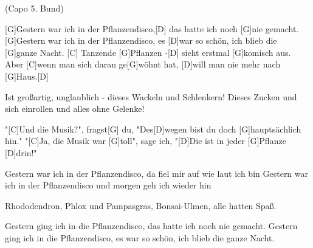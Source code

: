 
 {\footnotesize(Capo 5. Bund)}

\begin{guitar}
	[G]Gestern war ich in der Pflanzendisco,[D] das hatte ich noch [G]nie gemacht.
	[G]Gestern war ich in der Pflanzendisco, es [D]war so schön, ich blieb die [G]ganze Nacht.
	[C] Tanzende [G]Pflanzen -[D] sieht erstmal [G]komisch aus.
	Aber [C]wenn man sich daran ge[G]wöhnt hat, [D]will man nie mehr nach [G]Haus.[D]{}
	
	Ist großartig, unglaublich - dieses Wackeln und Schlenkern!
	Dieses Zucken und sich einrollen und alles ohne Gelenke!
	
	"[C]Und die Musik?", fragst[G] du, "Des[D]wegen bist du doch [G]hauptsächlich hin."
	"[C]Ja, die Musik war [G]toll", sage ich, "[D]Die ist in jeder [G]Pflanze [D]drin!"
	
	 
	
	Gestern war ich in der Pflanzendisco, da fiel mir auf wie laut ich bin
	Gestern war ich in der Pflanzendisco und morgen geh ich wieder hin
	
	Rhododendron, Phlox und Pampasgras,
	Bonsai-Ulmen, alle hatten Spaß.
	
	Gestern ging ich in die Pflanzendisco, das hatte ich noch nie gemacht.
	Gestern ging ich in die Pflanzendisco, es war so schön, ich blieb die ganze Nacht.
	
	 
\end{guitar}